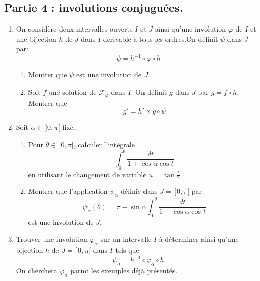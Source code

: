 \subsection*{Partie 4 : involutions conjuguées.}
\begin{enumerate}
  \item On considère deux intervalles ouverts $I$ et $J$ ainsi qu'une involution $\varphi$ de $I$ et une bijection $h$ de $J$ dans $I$ dérivable à tous les ordres.\newline On définit $\psi$  dans $J$ par:
\begin{displaymath}
  \psi = h^{-1}\circ \varphi \circ h
\end{displaymath}
\begin{enumerate}
  \item Montrer que $\psi$ est une involution de $J$.
  \item Soit $f$ une solution de $\mathcal{F}_\varphi$ dans $I$. On définit $g$ dans $J$ par $g = f\circ h$. Montrer que 
  \begin{displaymath}
    g' = h'\times g\circ \psi
  \end{displaymath}

\end{enumerate}
  
  \item Soit $\alpha\in\,]0,\pi[$ fixé.
\begin{enumerate}
  \item Pour $\theta\in\,]0,\pi[$, calculer l'intégrale
\begin{displaymath}
  \int_0^{\theta}\frac{dt}{1 + \cos\alpha \cos t}
\end{displaymath}
en utilisant le changement de variable $u = \tan \frac{t}{2}$.
  \item Montrer que l'application $\psi_\alpha$ définie dans $J =\,]0,\pi[$ par 
\begin{displaymath}
  \psi_\alpha(\theta) = \pi - \sin\alpha \int_0^{\theta}\frac{dt}{1 + \cos\alpha \cos t}
\end{displaymath}
est une involution de $J$.
\end{enumerate}
  
\item Trouver une involution $\varphi_\alpha$ sur un intervalle $I$ à déterminer ainsi qu'une bijection $h$ de $J=\,]0,\pi[$ dans $I$ tels que 
\begin{displaymath}
  \psi_\alpha = h^{-1}\circ \varphi_\alpha \circ h
\end{displaymath}
On cherchera $\varphi_\alpha$ parmi les exemples déjà présentés.
\end{enumerate}
